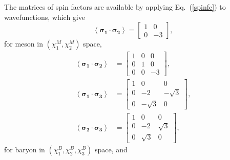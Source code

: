 \documentclass[prt,twocolumn,floatfix,nofootinbib]{revtex4}
\begin{document}
The matrices of spin factors are available by applying Eq.~(\ref{spinfc}) to wavefunctions, which give
\begin{equation}\label{sfcM}
    \left\langle \boldsymbol{\sigma_{1}}\cdot \boldsymbol{\sigma_{2}} \right\rangle=
    \begin{bmatrix}
        1 & 0 \\
        0 & -3
    \end{bmatrix},
\end{equation}
for meson in $(\chi_{1}^{M},\chi_{2}^{M})$ space,
    \begin{align}
        \left\langle \boldsymbol{\sigma_{1}}\cdot \boldsymbol{\sigma_{2}} \right\rangle&=
        \begin{bmatrix}
            1 & 0 & 0 \\
            0 & 1 & 0 \\
            0 & 0 & -3
        \end{bmatrix}, \\
        \left\langle \boldsymbol{\sigma_{1}}\cdot \boldsymbol{\sigma_{3}} \right\rangle&=
        \begin{bmatrix}
            1 & 0 & 0 \\
            0 & -2 & -\sqrt{3} \\
            0 & -\sqrt{3} & 0
        \end{bmatrix}, \\
        \left\langle \boldsymbol{\sigma_{2}}\cdot \boldsymbol{\sigma_{3}} \right\rangle&=
        \begin{bmatrix}
            1 & 0 & 0 \\
            0 & -2 & \sqrt{3} \\
            0 & \sqrt{3} & 0
        \end{bmatrix},
    \end{align}
for baryon in $(\chi_{1}^{B},\chi_{2}^{B},\chi_{3}^{B})$ space, and
\end{document}
